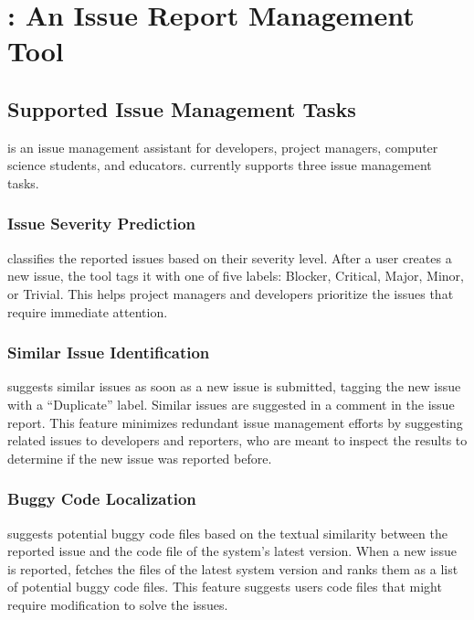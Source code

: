 
\section{\toolname: An Issue Report Management Tool}
\label{sec:tool}

\subsection{Supported Issue Management Tasks}
\toolname is an issue management assistant for developers, project managers, computer science students, and educators. \toolname currently supports three issue management tasks.

\subsubsection{Issue Severity Prediction}
\toolname classifies the reported issues based on their severity level. After a user creates a new issue, the tool tags it with one of five labels: Blocker, Critical, Major, Minor, or Trivial. This helps project managers and developers prioritize the issues that require immediate attention.

\subsubsection{Similar Issue Identification}
\toolname suggests similar issues as soon as a new issue is submitted, tagging the new issue with a ``Duplicate” label. Similar issues are suggested in a comment in the issue report.  
This feature minimizes redundant issue management efforts by suggesting related issues to developers and reporters, who are meant to inspect the results to determine if the new issue was reported before.

\subsubsection{Buggy Code Localization}
\toolname suggests potential buggy code files based on the textual similarity between the reported issue and the code file of the system's latest version. When a new issue is reported, \toolname fetches the files of the latest system version and ranks them as a list of potential buggy code files. This feature suggests users code files that might require modification to solve the issues.


